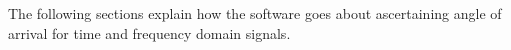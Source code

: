 The following sections explain how the software goes about ascertaining angle of arrival for time and frequency domain signals.





